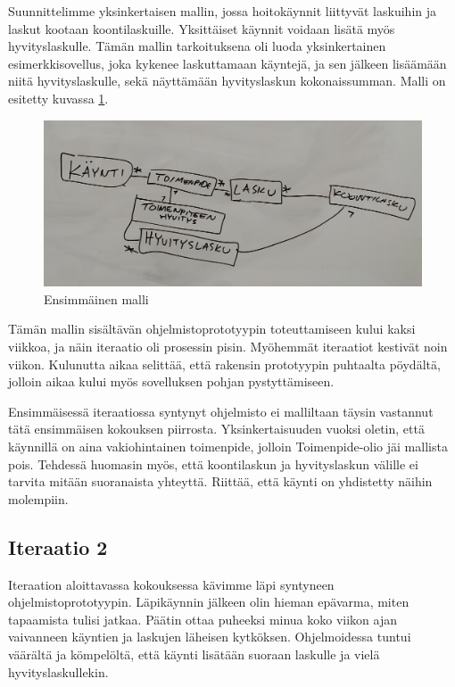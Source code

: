 Suunnittelimme yksinkertaisen mallin, jossa hoitokäynnit liittyvät
laskuihin ja laskut kootaan koontilaskuille. Yksittäiset käynnit voidaan
lisätä myös hyvityslaskulle. Tämän mallin tarkoituksena oli luoda
yksinkertainen esimerkkisovellus, joka kykenee laskuttamaan käyntejä, ja
sen jälkeen lisäämään niitä hyvityslaskulle, sekä näyttämään
hyvityslaskun kokonaissumman. Malli on esitetty kuvassa \ref{malli1}.

\begin{figure}
\centering
\includegraphics[width=\textwidth,height=0.3\textheight]{illustration/malli1.jpg}
\caption{\label{malli1} Ensimmäinen malli}
\end{figure}

Tämän mallin sisältävän ohjelmistoprototyypin toteuttamiseen kului kaksi
viikkoa, ja näin iteraatio oli prosessin pisin. Myöhemmät iteraatiot
kestivät noin viikon. Kulunutta aikaa selittää, että rakensin
prototyypin puhtaalta pöydältä, jolloin aikaa kului myös sovelluksen
pohjan pystyttämiseen.

Ensimmäisessä iteraatiossa syntynyt ohjelmisto ei malliltaan täysin
vastannut tätä ensimmäisen kokouksen piirrosta. Yksinkertaisuuden vuoksi
oletin, että käynnillä on aina vakiohintainen toimenpide, jolloin
Toimenpide-olio jäi mallista pois. Tehdessä huomasin myös, että
koontilaskun ja hyvityslaskun välille ei tarvita mitään suoranaista
yhteyttä. Riittää, että käynti on yhdistetty näihin molempiin.

\hypertarget{iteraatio-2}{%
\subsection{Iteraatio 2}\label{iteraatio-2}}

Iteraation aloittavassa kokouksessa kävimme läpi syntyneen
ohjelmistoprototyypin. Läpikäynnin jälkeen olin hieman epävarma, miten
tapaamista tulisi jatkaa. Päätin ottaa puheeksi minua koko viikon ajan
vaivanneen käyntien ja laskujen läheisen kytköksen. Ohjelmoidessa tuntui
väärältä ja kömpelöltä, että käynti lisätään suoraan laskulle ja vielä
hyvityslaskullekin.

